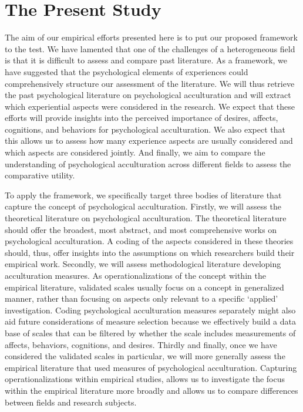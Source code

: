 \documentclass[man, 12pt, a4paper]{apa7}
\newcommand\Warning[1][2ex]{%
  \renewcommand\stacktype{L}%
  \scaleto{\stackon[1.3pt]{\color{red}$\triangle$}{\tiny\bfseries !}}{#1}}%
\begin{document}
\section{The Present Study}


The aim of our empirical efforts presented here is to put our proposed framework to the test. We have lamented that one of the challenges of a heterogeneous field is that it is difficult to assess and compare past literature. As a framework, we have suggested that the psychological elements of experiences could comprehensively structure our assessment of the literature. We will thus retrieve the past psychological literature on psychological acculturation and will extract which experiential aspects were considered in the research. We expect that these efforts will provide insights into the perceived importance of desires, affects, cognitions, and behaviors for psychological acculturation. We also expect that this allows us to assess how many experience aspects are usually considered and which aspects are considered jointly. And finally, we aim to compare the understanding of psychological acculturation across different fields to assess the comparative utility. 

To apply the framework, we specifically target three bodies of literature that capture the concept of psychological acculturation. Firstly, we will assess the theoretical literature on psychological acculturation. The theoretical literature should offer the broadest, most abstract, and most comprehensive works on psychological acculturation. A coding of the aspects considered in these theories should, thus, offer insights into the assumptions on which researchers build their empirical work.
Secondly, we will assess methodological literature developing acculturation measures. As operationalizations of the concept within the empirical literature, validated scales usually focus on a concept in generalized manner, rather than focusing on aspects only relevant to a specific `applied' investigation. Coding psychological acculturation measures separately might also aid future considerations of measure selection because we effectively build a data base of scales that can be filtered by whether the scale includes measurements of affects, behaviors, cognitions, and desires. 
Thirdly and finally, once we have considered the validated scales in particular, we will more generally assess the empirical literature that used measures of psychological acculturation. Capturing operationalizations within empirical studies, allows us to investigate the focus within the empirical literature more broadly and allows us to compare differences between fields and research subjects.
\end{document}
